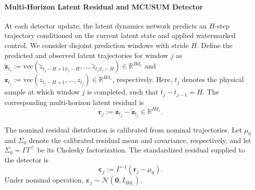 \documentclass[letterpaper, 10 pt, conference]{ieeeconf}
\theoremstyle{plain}
\begin{document}
\paragraph{Multi-Horizon Latent Residual and MCUSUM Detector}
At each detector update, the latent dynamics network predicts an $H$-step trajectory conditioned on the current latent state and applied watermarked control. We consider disjoint prediction windows with stride $H$.
Define the predicted and observed latent trajectories for window $j$ as $\widetilde{\mathbf{z}}_{t_j}:=\mathrm{vec}\left(\tilde z_{t_j-H+1|t_j-H}, \dots, \tilde z_{t_j|t_j-H}\right)\in\mathbb{R}^{Hd_z}$ and $\mathbf{z}_{t_j}:=\mathrm{vec}\left(z_{t_j-H+1}, \dots, z_{t_j}\right)\in\mathbb{R}^{Hd_z}$, respectively. Here, $t_j$ denotes the physical sample at which window $j$ is completed, such that $t_j-t_{j-1}=H$. The corresponding multi-horizon latent residual is
\begin{equation}\label{eq:latent_residual}
    \mathbf{r}_{j} := \mathbf{z}_{t_j} - \widetilde{\mathbf{z}}_{t_j}\in\mathbb{R}^{Hd_z}.
\end{equation}

The nominal residual distribution is calibrated from nominal trajectories. Let $\mu_0$ and $\Sigma_0$ denote the calibrated residual mean and covariance, respectively, and let $\Sigma_0 = \Gamma \Gamma^\top$ be its Cholesky factorization. The standardized residual supplied to the detector is
\begin{equation}\label{eq:whitened_residual}
    \pmb{\varepsilon}_j := \Gamma^{-1}\left(\mathbf{r}_j - \mu_0\right).
\end{equation}
Under nominal operation, $\pmb{\varepsilon}_j\sim\mathcal{N}(\mathbf{0},I_{Hd_z}).$
\end{document}
